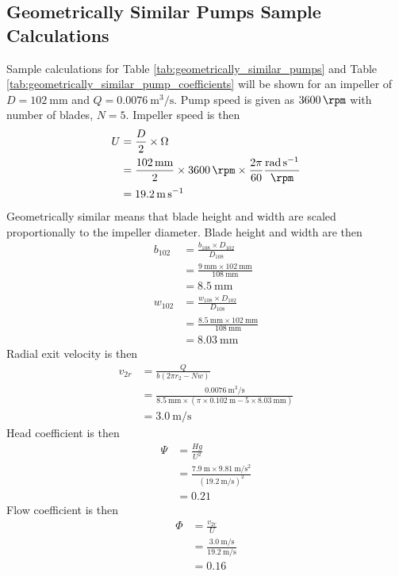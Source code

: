 \subsection{Geometrically Similar Pumps Sample Calculations}
Sample calculations for Table \ref{tab:geometrically_similar_pumps} and Table \ref{tab:geometrically_similar_pump_coefficients} will be shown for an impeller of $D = \qty{102}{\milli\meter}$ and $Q = \qty{0.0076}{\meter\cubed\per\second}$. Pump speed is given as $\qty{3600}{\rpm}$ with number of blades, $N = 5$. Impeller speed is then
\begin{align*}
    U &= \frac{D}{2} \times \Omega \\
    &= \frac{\qty{102}{\milli\meter}}{2} \times \qty{3600}{\rpm} \times \frac{2\pi}{60} \frac{\unit{\radian\per\second}}{\unit{\rpm}} \\
    &= \qty{19.2}{\meter\per\second}
\end{align*}
Geometrically similar means that blade height and width are scaled proportionally to the impeller diameter. Blade height and width are then
\begin{align*}
    b_{102} &= \frac{b_{108} \times D_{102}}{D_{108}} \\
    &= \frac{\qty{9}{\milli\meter} \times \qty{102}{\milli\meter}}{\qty{108}{\milli\meter}} \\
    &= \qty{8.5}{\milli\meter} \\
    w_{102} &= \frac{w_{108} \times D_{102}}{D_{108}} \\
    &= \frac{\qty{8.5}{\milli\meter} \times \qty{102}{\milli\meter}}{\qty{108}{\milli\meter}} \\
    &= \qty{8.03}{\milli\meter}
\end{align*}
Radial exit velocity is then
\begin{align*}
    v_{2r} &= \frac{Q}{b(2\pi r_2 - Nw)} \\
    &= \frac{\qty{0.0076}{\meter\cubed\per\second}}{\qty{8.5}{\milli\meter} \times (\pi \times \qty{0.102}{\meter} - 5 \times \qty{8.03}{\milli\meter})} \\
    &= \qty{3.0}{\meter\per\second}
\end{align*}
Head coefficient is then
\begin{align*}
    \Psi &= \frac{Hg}{U^2} \\
    &= \frac{\qty{7.9}{\meter} \times \qty{9.81}{\meter\per\second\squared}}{(\qty{19.2}{\meter\per\second})^2} \\
    &= 0.21
\end{align*}
Flow coefficient is then
\begin{align*}
    \Phi &= \frac{v_{2r}}{U} \\
    &= \frac{\qty{3.0}{\meter\per\second}}{\qty{19.2}{\meter\per\second}} \\
    &= 0.16
\end{align*}

